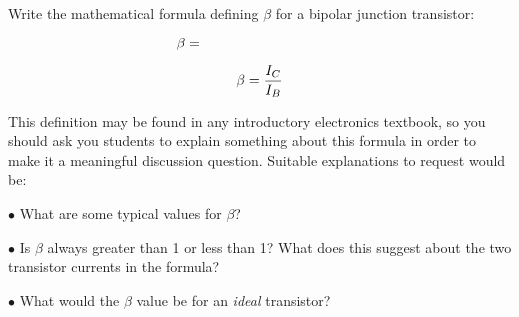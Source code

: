 

Write the mathematical formula defining $\beta$ for a bipolar junction transistor:

$$\beta = \hbox{\hskip 100pt}$$







$$\beta = {I_C \over I_B}$$







This definition may be found in any introductory electronics textbook, so you should ask you students to explain something about this formula in order to make it a meaningful discussion question.  Suitable explanations to request would be:

\medskip
\goodbreak
\item{$\bullet$} What are some typical values for $\beta$?
\item{$\bullet$} Is $\beta$ always greater than 1 or less than 1?  What does this suggest about the two transistor currents in the formula?
\item{$\bullet$} What would the $\beta$ value be for an {\it ideal} transistor?
\medskip





